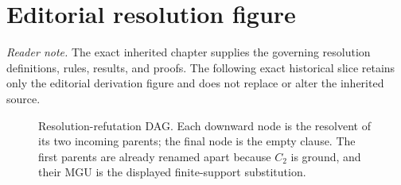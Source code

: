 \section*{Editorial resolution figure}
\noindent\textit{Reader note.} The exact inherited chapter supplies the governing
resolution definitions, rules, results, and proofs.  The following exact
historical slice retains only the editorial derivation figure and does not
replace or alter the inherited source.

\begin{figure}[htbp]
\centering
{}
\caption{Resolution-refutation DAG.  Each downward node is
the resolvent of its two incoming parents; the final node is the empty clause.
The first parents are already renamed apart because \(C_2\) is ground, and
their MGU is the displayed finite-support substitution.}
\label{fig:p02-fol-resolution-dag}
\end{figure}
